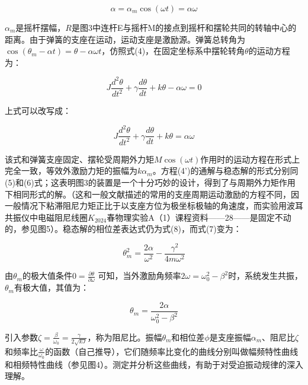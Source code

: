 \documentclass[12pt,a4paper]{amsart}
\begin{document}
\begin{equation}
    \alpha = \alpha_m \cos(\omega t) = \alpha \omega \tag{9}
\end{equation}

$\alpha_m$是摇杆摆幅，$R$是图3中连杆E与摇杆M的接点到摇杆和摆轮共同的转轴中心的距离。由于弹簧的支座在运动，运动支座是激励源。弹簧总转角为 $\cos(\theta_m - \alpha t) = \theta - \alpha \omega t$，仿照式(4)，在固定坐标系中摆轮转角$\theta$的运动方程为：

\begin{equation}
    J\frac{d^2\theta}{dt^2} + \gamma\frac{d\theta}{dt} + k\theta - \alpha \omega = 0 \tag{10}
\end{equation}

上式可以改写成：

\begin{equation}
    J\frac{d^2\theta}{dt^2} + \gamma\frac{d\theta}{dt} + k\theta = \alpha \omega \tag{4'}
\end{equation}

该式和弹簧支座固定、摆轮受周期外力矩$M\cos(\omega t)$作用时的运动方程在形式上完全一致，等效外激励力矩的振幅为$k\alpha_m$。方程(4')的通解与稳态解的形式分别同(5)和(6)式；这表明图3的装置是一个十分巧妙的设计，得到了与周期外力矩作用下相同形式的解。（这和一般文献描述的常用的支座周期运动激励的方程不同，因一般情况下粘滞阻尼力矩正比于以支座方位为极坐标极轴的角速度，而实验用波耳共振仪中电磁阻尼线圈$K_{2024}$春物理实验A（1）课程资料——28——是固定不动的，参见图5）。稳态解的相位差表达式仍为式(8)，而式(7)变为：

\begin{equation}
    \theta_m^2 = \frac{2\alpha}{\omega^2} - \frac{\gamma^2}{4m\omega^2} \tag{7'}
\end{equation}

由$\theta_m$的极大值条件$0 = \frac{\partial \theta}{\partial \omega}$ 可知，当外激励角频率$2\omega = \omega_0^2 - \beta^2$时，系统发生共振，$\theta_m$有极大值，其值为：

\begin{equation}
    \theta_m = \frac{2\alpha}{\omega_0^2 - \beta^2}
\end{equation}

引入参数$\zeta = \frac{\beta}{\omega_0} = \frac{\gamma}{2\sqrt{kJ}}$，称为阻尼比。振幅$\theta_m$和相位差$\phi$是支座振幅$\alpha_m$、阻尼比$\zeta$和频率比$\frac{\omega}{\omega_0}$的函数（自己推导），它们随频率比变化的曲线分别叫做幅频特性曲线和相频特性曲线（参见图4）。测定并分析这些曲线，有助于对受迫振动规律的深入理解。
\end{document}
